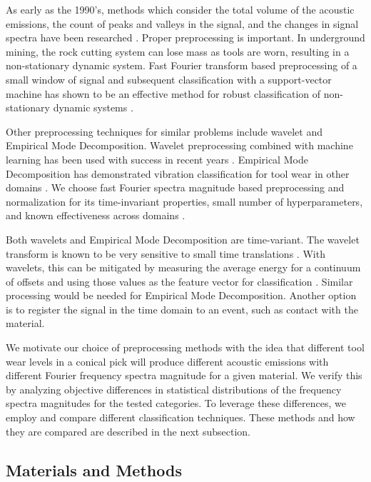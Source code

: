 As early as the 1990's, methods which consider the total volume of the acoustic emissions,
the count of peaks and valleys in the signal, and the changes in signal spectra 
have been researched \cite{Tan1992,Kakade1995}.
Proper preprocessing is important. 
In underground mining, the rock cutting system can lose mass as tools are worn,
resulting in a non-stationary dynamic system.
Fast Fourier transform based preprocessing of a small window of signal
 and subsequent classification with a support-vector machine has shown 
 to be an effective method for robust classification of non-stationary dynamic systems \cite{xu2016fftsvm}.

Other preprocessing techniques for similar problems include wavelet and Empirical Mode Decomposition.
Wavelet preprocessing combined with machine learning
has been used with success in recent years 
 \cite{he2013vibration, sadegh2016classification, skariah2021health}.
Empirical Mode Decomposition has demonstrated vibration classification for tool wear
 in other domains \cite{Xu2009, Nie2011, Zhan2014}.
We choose fast Fourier spectra magnitude based preprocessing and normalization for its time-invariant properties,
small number of hyperparameters, and known effectiveness across domains \cite{Xu2016, Harlianto2022}.

Both wavelets and Empirical Mode Decomposition are time-variant.
The wavelet transform is known to be very sensitive to small time translations \cite{Yen1999}.
With wavelets, this can be mitigated by measuring the average energy for 
a continuum of offsets and using those values 
as the feature vector for classification \cite{Baccar2015}.
Similar processing would be needed for Empirical Mode Decomposition. 
Another option is to register the signal in the time domain to an event, such as contact with the material.

We motivate our choice of preprocessing methods with the idea that different tool wear levels in a conical pick
will produce different acoustic emissions with different Fourier frequency spectra magnitude for a given material. 
We verify this by analyzing objective differences in statistical distributions 
of the frequency spectra magnitudes for the tested categories.
To leverage these differences, we employ and compare different classification techniques.
These methods and how they are compared are described in the next subsection.

\subsection{Materials and Methods}\label{sec2}

